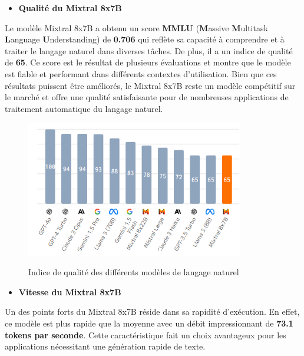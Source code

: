 \begin{itemize}
    \item \textbf{Qualité du Mixtral 8x7B }
\end{itemize}
\noindent Le modèle Mixtral 8x7B a obtenu un score \textbf{MMLU} (\textbf{M}assive \textbf{M}ultitask \textbf{L}anguage \textbf{U}nderstanding) de \textbf{0.706} qui reflète sa capacité à comprendre et à traiter le langage naturel dans diverses tâches. De plus, il a un indice de qualité de \textbf{65}. Ce score est le résultat de plusieurs évaluations et montre que le modèle est fiable et performant dans différents contextes d'utilisation. Bien que ces résultats puissent être améliorés, le Mixtral 8x7B reste un modèle compétitif sur le marché et offre une qualité satisfaisante pour de nombreuses applications de traitement automatique du langage naturel.
\begin{figure}[H]
    \centering
    \includegraphics[width=0.85\textwidth,height=0.5\textwidth]{images/chp5/fig6.png}
    \caption{Indice de qualité des différents modèles de langage naturel} \cite{mixtral8x7b}
    \label{fig: Indice de qualité des différents modèles de langage naturel}    
\end{figure}
\begin{itemize}
    \item \textbf{Vitesse du Mixtral 8x7B}
\end{itemize}
\noindent Un des points forts du Mixtral 8x7B réside dans sa rapidité d'exécution. En effet, ce modèle est plus rapide que la moyenne avec un débit impressionnant de \textbf{73.1 tokens par seconde}. Cette caractéristique fait un choix avantageux pour les applications nécessitant une génération rapide de texte.
